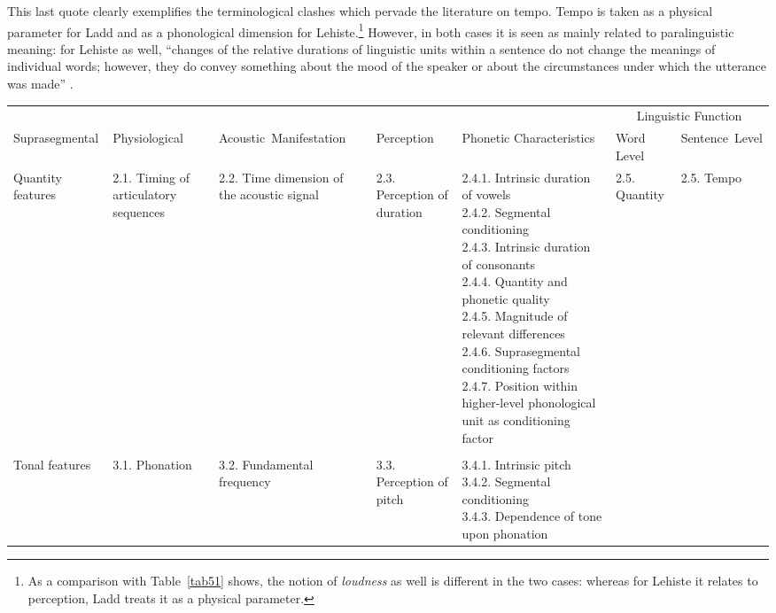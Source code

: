 This last quote clearly exemplifies the terminological clashes which pervade the literature on tempo. Tempo is taken as a physical parameter for Ladd and as a phonological dimension for Lehiste.\footnote{As a comparison with Table~\ref{tab51} shows, the notion of \textit{loudness} as well is different in the two cases: whereas for Lehiste it relates to perception, Ladd treats it as a physical parameter.} However, in both cases it is seen as mainly related to paralinguistic meaning: for Lehiste as well, ``changes of the relative durations of linguistic units within a sentence do not change the meanings of individual words; however, they do convey something about the mood of the speaker or about the circumstances under which the utterance was made'' \cite[§2.5.3]{lehiste1970suprasegmentals}.

\begin{landscape}
\begin{table}[p]
\centering
\raggedright
\scriptsize
\begin{tabular}{lp{1.8cm}p{2.7cm}p{2cm}llp{1.6cm}}
\mytoprule
& & & & & \multicolumn{2}{c}{Linguistic Function}\\
Suprasegmental & Physiological & \mbox{Acoustic Manifestation} & Perception & Phonetic Characteristics & Word Level & \mbox{Sentence Level} \\
\midrule
{Quantity features} & {2.1. Timing of articulatory sequences} & {2.2. Time dimension of the acoustic signal} & {2.3. Perception of duration} & \parbox[t]{3cm}{\raggedright 2.4.1. Intrinsic duration of vowels\\
2.4.2. Segmental conditioning \\
2.4.3. Intrinsic duration of consonants \\
2.4.4. Quantity and phonetic quality \\
2.4.5. Magnitude of relevant differences\\
2.4.6. Suprasegmental conditioning factors\\
2.4.7. Position within higher-level phonological unit as conditioning factor
}& {2.5. Quantity} & {2.5. Tempo} \\
& & \\
{Tonal features} & {3.1. Phonation} & {\raggedright 3.2. Fundamental \mbox{frequency}} & {3.3. Perception of pitch} & \parbox[t]{3cm}{\raggedright 3.4.1. Intrinsic pitch \\
3.4.2. Segmental conditioning \\
3.4.3. Dependence of tone upon phonation \\
}
\end{tabular}
\end{table}
\end{landscape}
